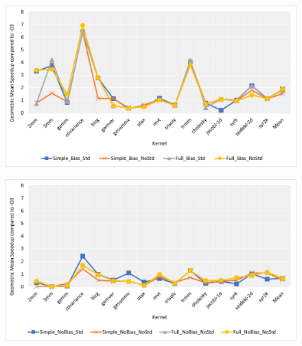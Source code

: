 \documentclass[logo,msc]{infthesis}           %
\begin{document}
\begin{preliminary}
\begin{figure}
\centering
\begin{minipage}{.45\linewidth}
  \includegraphics[width=\linewidth]{Images/Bias_Chart.png}
  \label{Bias_Chart}
\end{minipage}
\hspace{.05\linewidth}
\begin{minipage}{.45\linewidth}
  \includegraphics[width=\linewidth]{Images/NoBias_Chart.png}
  \label{NoBias_Chart}
\end{minipage}
\end{figure}


\end{preliminary}
\end{document}

